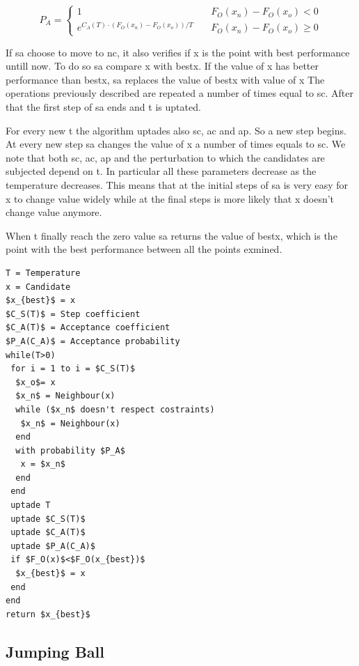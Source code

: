 \documentclass[journal]{IEEEtran}
\begin{document}
 \begin{equation}
 	\label{accept_prob}
	P_A = \begin{cases}
		1 & \quad F_O (x_n)-F_O (x_o) < 0 \\
		e^{ C_A(T)  \cdot(F_O (x_n)-F_O (x_o))/T } & \quad F_O (x_n)-F_O(x_o) \geq 0
\end{cases}
 \end{equation}

If \gls{sa} choose to move to \gls{nc}, it also verifies if \gls{x} is the point with best performance untill now. To do so \gls{sa} compare \gls{x} with \gls{bestx}. If the value of \gls{x} has better performance than \gls{bestx}, \gls{sa} replaces the value of \gls{bestx} with value of \gls{x} The operations previously described are repeated a number of times equal to \gls{sc}. After that the first step of \gls{sa} ends and \gls{t} is uptated.

For every new \gls{t} the algorithm uptades also \gls{sc}, \gls{ac} and \gls{ap}. So a new step begins. At every new step \gls{sa} changes the value of \gls{x} a number of times equals to \gls{sc}. We note that both \gls{sc}, \gls{ac}, \gls{ap} and the perturbation to which the candidates are subjected depend on \gls{t}. In particular all these parameters decrease as the temperature decreases. This means that at the initial steps of \gls{sa} is very easy for \gls{x} to change value widely while at the final steps is more likely that \gls{x} doesn't change value anymore.

When \gls{t} finally reach the zero value \gls{sa} returns the value of \gls{bestx}, which is the point with the best performance between all the points exmined.

\begin{lstlisting}[mathescape=true,frame=single]
T = Temperature
x = Candidate
$x_{best}$ = x
$C_S(T)$ = Step coefficient
$C_A(T)$ = Acceptance coefficient
$P_A(C_A)$ = Acceptance probability
while(T>0)
 for i = 1 to i = $C_S(T)$
  $x_o$= x
  $x_n$ = Neighbour(x)
  while ($x_n$ doesn't respect costraints)
   $x_n$ = Neighbour(x)
  end
  with probability $P_A$
   x = $x_n$
  end
 end
 uptade T
 uptade $C_S(T)$
 uptade $C_A(T)$
 uptade $P_A(C_A)$
 if $F_O(x)$<$F_O(x_{best})$
  $x_{best}$ = x
 end
end
return $x_{best}$
\end{lstlisting}  \label{code_sa}

\subsection{Jumping Ball}
\end{document}
